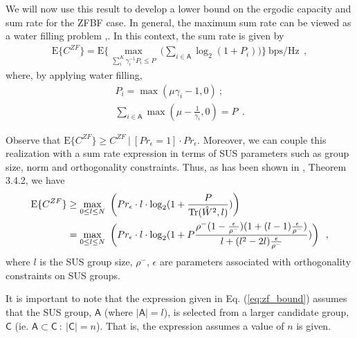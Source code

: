  We will now use this result to develop a lower bound on the ergodic capacity and sum rate for the ZFBF case. In general, the maximum sum rate can be viewed as a water filling problem \cite{Caire2003},\cite{Yoo2006}. In this context, the sum rate is given by
   \begin{equation}\label{eq:zf_sum_rate}
     \begin{aligned}
        \text{E}\lbrace C^{ZF}\rbrace = \text{E}\lbrace \max\limits_{\sum_i^K \gamma_i^{-1} P_i \leq P}\ \bigg( \sum_{i\in\mathsf{A}}\log_2(1 + P_i) \bigg)\rbrace\ \text{bps/Hz} \ \ ,
     \end{aligned}
 \end{equation}
 where, by applying water filling,
    \begin{equation}\label{eq:zf_waterfilling}
     \begin{aligned}
        P_i = \max(\mu\gamma_i-1,0) \ ;\\
        \sum_{i\in\mathsf{A}}\max(\mu-\frac{1}{\gamma_i},0 ) = P \ \ .
     \end{aligned}
 \end{equation}
 
 Observe that $\text{E}\lbrace C^{ZF} \rbrace \geq C^{ZF} \ \vert \ [Pr_\epsilon = 1] \cdot Pr_\epsilon$. Moreover, we can couple this realization with a sum rate expression in terms of SUS parameters such as group size, norm and orthogonality constraints. Thus, as has been shown in \cite{SwannackThesis}, Theorem 3.4.2, we have
 \begin{equation}\label{eq:zf_bound}
     \begin{aligned}
       \text{E}\lbrace C^{ZF}\rbrace &\geq  \max\limits_{0\leq l \leq N}\ \bigg( Pr_\epsilon \cdot l\cdot \log_2(1 + \frac{P}{\text{Tr}(\Hat{W}^2,l)}) \bigg)\\
       &=  \max\limits_{0\leq l \leq N}\ \bigg( Pr_\epsilon \cdot  l\cdot \log_2(1 + P \frac{\rho^-(1-\frac{\epsilon}{\rho^-})(1+(l-1)\frac{\epsilon}{\rho^-})}{l+(l^2-2l)\frac{\epsilon}{\rho^-}}) \bigg) \ \ ,
     \end{aligned}
 \end{equation}
 where $l$ is the SUS group size, $\rho^-$, $\epsilon$ are parameters associated with orthogonality constraints on SUS groups.
 
 It is important to note that the expression given in Eq. (\ref{eq:zf_bound}) assumes that the SUS group, $\mathsf{A}$ (where $\vert\mathsf{A}\vert =l$), is selected from a larger candidate group, $\mathsf{C}$ (ie. $\mathsf{A}\subset\mathsf{C} \ : \ \vert \mathsf{C} \vert = n$). That is, the expression assumes a value of $n$ is given.